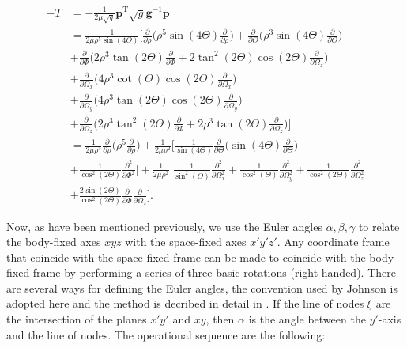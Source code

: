 \begin{equation}\label{eq:T_SW}
\begin{aligned}
-T &= -\frac{1}{2\mu \sqrt{g}} \mathbf{p}^\mathrm{T} \sqrt{g} \mathbf{g}^{-1} \mathbf{p}\\
&= \frac{1}{2\mu \rho^5 \sin(4\Theta)}\Bigg[ \frac{\partial}{\partial \rho} \Bigg(\rho^5 \sin(4 \Theta) \frac{\partial}{\partial \rho}\Bigg) + \frac{\partial}{\partial \Theta}\Bigg(\rho^3\sin(4\Theta)\frac{\partial}{\partial\Theta}\Bigg)\\ &+\frac{\partial}{\partial\Phi}\Bigg(2\rho^3\tan(2\Theta)\frac{\partial}{\partial\Phi} + 2\tan^2(2\Theta)\cos(2\Theta)\frac{\partial}{\partial\Omega_z}\Bigg)\\
&+\frac{\partial}{\partial\Omega_x}\Bigg(4\rho^3\cot(\Theta)\cos(2\Theta)\frac{\partial}{\partial\Omega_x}\Bigg)\\
&+\frac{\partial}{\partial\Omega_y}\Bigg(4\rho^3\tan(2\Theta)\cos(2\Theta)\frac{\partial}{\partial\Omega_y}\Bigg)\\
&+\frac{\partial}{\partial\Omega_z}\Bigg(2\rho^3\tan^2(2\Theta)\frac{\partial}{\partial\Phi}+2\rho^3\tan(2\Theta)\frac{\partial}{\partial\Omega_z}\Bigg)\Bigg]\\
&=\frac{1}{2\mu\rho^5}\frac{\partial}{\partial\rho}\Bigg(\rho^5\frac{\partial}{\partial\rho}\Bigg) + \frac{1}{2\mu\rho^2}\Bigg[\frac{1}{\sin(4\Theta)}\frac{\partial}{\partial\Theta}\Bigg(\sin(4\Theta)\frac{\partial}{\partial\Theta}\Bigg)\\
&+\frac{1}{\cos^2(2\Theta)}\frac{\partial^2}{\partial\Phi^2} \Bigg]+\frac{1}{2\mu\rho^2}\Bigg[\frac{1}{\sin^2(\Theta)}\frac{\partial^2}{\partial\Omega^2_x} + \frac{1}{\cos^2(\Theta)}\frac{\partial^2}{\partial\Omega^2_y} + \frac{1}{\cos^2(2\Theta)}\frac{\partial^2}{\partial\Omega^2_z}\\
&+ \frac{2\sin(2\Theta)}{\cos^2(2\Theta)}\frac{\partial}{\partial\Phi}\frac{\partial}{\partial\Omega_z}\Bigg].
\end{aligned}
\end{equation}

Now, as have been mentioned previously, we use the Euler angles $\alpha,\beta,\gamma$ to relate the body-fixed axes $xyz$ with the space-fixed axes $x'y'z'$. Any coordinate frame that coincide with the space-fixed frame can be made to coincide with the body-fixed frame by performing a series of three basic rotations (right-handed). There are several ways for defining the Euler angles, the convention used by Johnson \cite{Johnson_1983} is adopted here and the method is decribed in detail in \cite{arfken_weber_harris_2013}. If the line of nodes $\xi$ are the intersection of the planes $x'y'$ and $xy$, then $\alpha$ is the angle between the $y'$-axis and the line of nodes. The operational sequence are the following:

